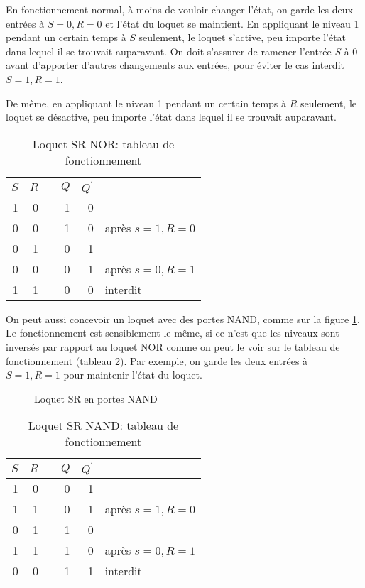 \documentclass[11pt]{article}
\begin{document}
En fonctionnement normal, à moins de vouloir changer l'état, on garde
les deux entrées à \(S=0, R=0\) et l'état du loquet se maintient. En
appliquant le niveau 1 pendant un certain temps à \(S\) seulement, le
loquet s'active, peu importe l'état dans lequel il se trouvait
auparavant. On doit s'assurer de ramener l'entrée \(S\) à 0 avant
d'apporter d'autres changements aux entrées, pour éviter le cas
interdit \(S=1, R=1\).

De même, en appliquant le niveau 1 pendant un certain
temps à \(R\) seulement, le loquet se désactive, peu importe l'état
dans lequel il se trouvait auparavant.

\begin{table}[htbp]
\caption{\label{tab:org13a7e21}Loquet SR NOR: tableau de fonctionnement}
\centering
\begin{tabular}{rrlrrl}
\(S\) & \(R\) &  & \(Q\) & \(Q^\prime\) & \\[0pt]
\hline
1 & 0 &  & 1 & 0 & \\[0pt]
0 & 0 &  & 1 & 0 & après \(s=1, R=0\)\\[0pt]
0 & 1 &  & 0 & 1 & \\[0pt]
0 & 0 &  & 0 & 1 & après \(s=0, R=1\)\\[0pt]
1 & 1 &  & 0 & 0 & interdit\\[0pt]
\end{tabular}
\end{table}

On peut aussi concevoir un loquet avec des portes NAND, comme sur la
figure \ref{fig:org3a9dec9}. Le fonctionnement est sensiblement le même,
si ce n'est que les niveaux sont inversés par rapport au loquet NOR
comme on peut le voir sur le tableau de fonctionnement (tableau
\ref{tab:org9c93311}). Par exemple, on garde les deux entrées à \(S=1, R=1\)
pour maintenir l'état du loquet.

\begin{figure}[htbp]
\centering

\caption{\label{fig:org3a9dec9}Loquet SR en portes NAND}
\end{figure}

\begin{table}[htbp]
\caption{\label{tab:org9c93311}Loquet SR NAND: tableau de fonctionnement}
\centering
\begin{tabular}{rrlrrl}
\(S\) & \(R\) &  & \(Q\) & \(Q^\prime\) & \\[0pt]
\hline
1 & 0 &  & 0 & 1 & \\[0pt]
1 & 1 &  & 0 & 1 & après \(s=1, R=0\)\\[0pt]
0 & 1 &  & 1 & 0 & \\[0pt]
1 & 1 &  & 1 & 0 & après \(s=0, R=1\)\\[0pt]
0 & 0 &  & 1 & 1 & interdit\\[0pt]
\end{tabular}
\end{table}
\end{document}
